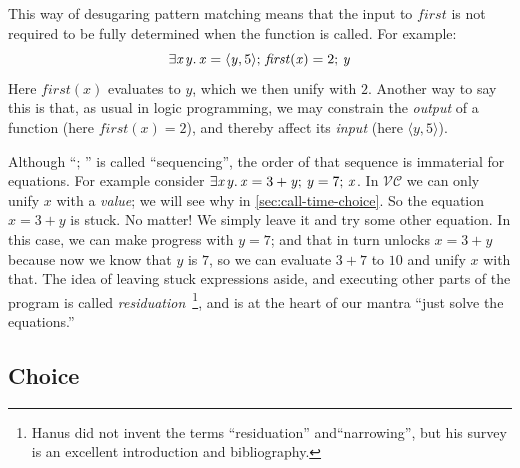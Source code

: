 \documentclass[acmsmall,review,dvipsnames]{acmart}
\newcommand{\Varid}[1]{\mathit{#1}}
\newcommand{\versecalc}{$\mathcal{VC}$}
\begin{document}
This way of desugaring pattern matching means that the input
to \ensuremath{\Varid{first}} is not required to be fully determined when the function is called. For example:
$$
\ensuremath{\exists\Varid{x}\hspace{0.3mm}\Varid{y}.\,\Varid{x}\mathrel{=}\langle{}\Varid{y},\mathrm{5}\rangle;\,\Varid{first}(\Varid{x})\mathrel{=}\mathrm{2};\,\Varid{y}}
$$
Here \ensuremath{\Varid{first}(\Varid{x})} evaluates to \ensuremath{\Varid{y}}, which we then unify with \ensuremath{\mathrm{2}}.
Another way to say this is that, as usual in logic programming, we may
constrain the \emph{output} of a function (here \ensuremath{\Varid{first}(\Varid{x})\mathrel{=}\mathrm{2}}), and thereby
affect its \emph{input} (here \ensuremath{\langle{}\Varid{y},\mathrm{5}\rangle}).

Although ``\ensuremath{;\,}\!'' is called ``sequencing'', the order of that sequence
is immaterial for equations.
For example
consider \ensuremath{\exists\Varid{x}\hspace{0.3mm}\Varid{y}.\,\Varid{x}\mathrel{=}\mathrm{3}\mathbin{+}\Varid{y};\,\Varid{y}\mathrel{=}\mathrm{7};\,\Varid{x}}.  In \versecalc{} we can only unify \ensuremath{\Varid{x}} with a \emph{value};
we will see why in \cref{sec:call-time-choice}. So the equation \ensuremath{\Varid{x}\mathrel{=}\mathrm{3}\mathbin{+}\Varid{y}} is stuck.
No matter!  We simply leave it and try some other equation. In this case, we can make progress with \ensuremath{\Varid{y}\mathrel{=}\mathrm{7}};
and that in turn unlocks \ensuremath{\Varid{x}\mathrel{=}\mathrm{3}\mathbin{+}\Varid{y}} because now we know that \ensuremath{\Varid{y}} is \ensuremath{\mathrm{7}}, so we can evaluate \ensuremath{\mathrm{3}\mathbin{+}\mathrm{7}} to \ensuremath{\mathrm{10}}
and unify \ensuremath{\Varid{x}} with that.  The idea of leaving stuck expressions aside, and executing other parts of the
program is called
\emph{residuation}~\cite{hanus:survey}\footnote{Hanus did not invent the terms ``residuation'' and``narrowing'', but
his survey is an excellent introduction and bibliography.}, and is at the heart of our mantra ``just solve the equations.''

\subsection{Choice} \label{sec:choice} \label{sec:call-time-choice}
\end{document}
